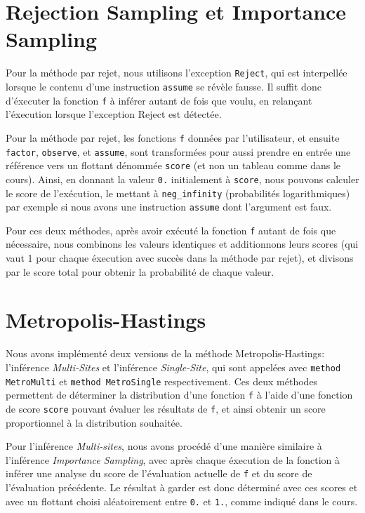 \documentclass[svgnames]{article}
\begin{document}
\section{Rejection Sampling et Importance Sampling}

Pour la méthode par rejet, nous utilisons l'exception \texttt{Reject}, qui est interpellée lorsque le contenu d'une instruction \texttt{assume} se révèle fausse. Il suffit donc d'éxecuter la fonction \texttt{f} à inférer autant de fois que voulu, en relançant l'éxecution lorsque l'exception Reject est détectée.

Pour la méthode par rejet, les fonctions \texttt f données par l'utilisateur, et ensuite \texttt{factor}, \texttt{observe}, et \texttt{assume}, sont transformées pour aussi prendre en entrée une référence vers un flottant dénommée \texttt{score} (et non un tableau comme dans le cours). Ainsi, en donnant la valeur \texttt{0.} initialement à \texttt{score}, nous pouvons calculer le score de l'exécution, le mettant à \verb|neg_infinity| (probabilités logarithmiques) par exemple si nous avons une instruction \texttt{assume} dont l'argument est faux.

Pour ces deux méthodes, après avoir exécuté la fonction \texttt{f} autant de fois que nécessaire, nous combinons les valeurs identiques et additionnons leurs scores (qui vaut 1 pour chaque éxecution avec succès dans la méthode par rejet), et divisons par le score total pour obtenir la probabilité de chaque valeur.

\section{Metropolis-Hastings}

Nous avons implémenté deux versions de la méthode Metropolis-Hastings: l'inférence \emph{Multi-Sites} et l'inférence \emph{Single-Site}, qui sont appelées avec \lstinline{method MetroMulti}  et \lstinline{method MetroSingle} respectivement. Ces deux méthodes permettent de déterminer la distribution d'une fonction \verb|f| à l'aide d'une fonction de score \verb|score| pouvant évaluer les résultats de \verb|f|, et ainsi obtenir un score proportionnel à la distribution souhaitée.

Pour l'inférence \emph{Multi-sites}, nous avons procédé d'une manière similaire à l'inférence \emph{Importance Sampling}, avec après chaque éxecution de la fonction à inférer une analyse du score de l'évaluation actuelle de \verb|f| et du score de l'évaluation précédente. Le résultat à garder est donc déterminé avec ces scores et avec un flottant choisi aléatoirement entre \verb|0.| et \verb|1.|, comme indiqué dans le cours.
\end{document}
